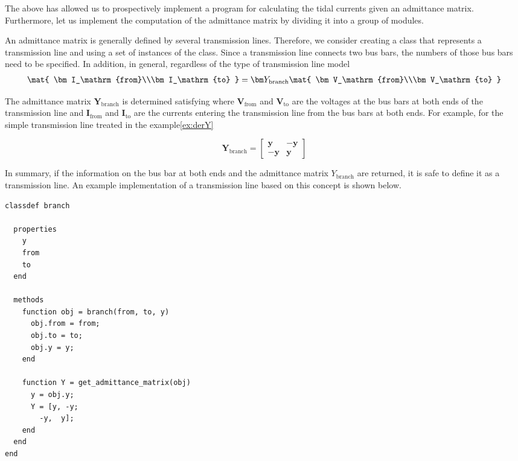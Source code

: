 \documentclass[graybox, envcountchap]{svmult}
\begin{document}
The above has allowed us to prospectively implement a program for calculating the tidal currents given an admittance matrix.
Furthermore, let us implement the computation of the admittance matrix by dividing it into a group of modules.

\begin{example}
An admittance matrix is generally defined by several transmission lines.
Therefore, we consider creating a class that represents a transmission line and using a set of instances of the class.
Since a transmission line connects two bus bars, the numbers of those bus bars need to be specified.
In addition, in general, regardless of the type of transmission line model
\begin{align}
\mat{
\bm I_\mathrm{from}\\\bm I_\mathrm{to}
} =
\bm Y_\mathrm{branch}
\mat{
\bm V_\mathrm{from}\\\bm V_\mathrm{to}
}
\end{align}

The admittance matrix $\bm Y_\mathrm{branch}$ is determined satisfying where $\bm V_\mathrm{from}$ and $\bm V_\mathrm{to}$ are the voltages at the bus bars at both ends of the transmission line and $\bm I_\mathrm{from}$ and $\bm I_\mathrm{to}$ are the currents entering the transmission line from the bus bars at both ends.
For example, for the simple transmission line treated in the example\ref{ex:derY}

\[
\bm Y_\mathrm{branch} = \begin{bmatrix}
\bm y & -\bm y\\
-\bm y & \bm y
\end{bmatrix}
\]

In summary, if the information on the bus bar at both ends and the admittance matrix $Y_\mathrm{branch}$ are returned, it is safe to define it as a transmission line.
An example implementation of a transmission line based on this concept is shown below.

\smallskip
\begin{PROGRAMA}[count,title={branch.m}]\label{program:branch}
\begin{verbatim}
classdef branch
  
  properties
    y
    from
    to
  end
  
  methods
    function obj = branch(from, to, y)
      obj.from = from;
      obj.to = to;
      obj.y = y;
    end
    
    function Y = get_admittance_matrix(obj)
      y = obj.y;
      Y = [y, -y;
        -y,  y];
    end
  end
end
\end{verbatim}\end{PROGRAMA}


\end{example}
\end{document}
